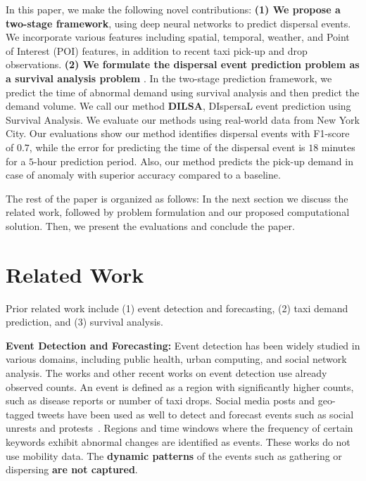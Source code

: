 \documentclass[letterpaper]{article} %
\begin{document}
In this paper, we make the following novel contributions: \textbf{(1) We propose a two-stage framework}, using deep neural networks to predict dispersal events. We incorporate various features including spatial, temporal, weather, and Point of Interest (POI) features, in addition to recent taxi pick-up and drop observations. %
\textbf{(2) We formulate the dispersal event prediction problem as a survival analysis problem} \cite{miller2011survival}.%
In the two-stage prediction framework, we predict the time of abnormal demand using survival analysis and then predict the demand volume. We call our method \textbf{DILSA}, DIspersaL event prediction using Survival Analysis. We evaluate our methods using real-world data from New York City. Our evaluations show our method identifies dispersal events with F1-score of $0.7$, while the error for predicting the time of the dispersal event is $18$ minutes for a $5$-hour prediction period. Also, our method predicts the pick-up demand in case of anomaly with superior accuracy compared to a baseline.

The rest of the paper is organized as follows: In the next section we discuss the related work, followed by problem formulation and our proposed computational solution. Then, we present the evaluations and conclude the paper.



\section{Related Work}
\label{related_work}
Prior related work include (1) event detection and forecasting, (2) taxi demand prediction, and (3) survival analysis.

\textbf{Event Detection and Forecasting:} Event detection has been widely studied in various domains, including public health, urban computing, and social network analysis. The works \cite{kulldorff1997spatial,kulldorff2005space,neill2009expectation} and other recent works on event detection \cite{li2012mining,hong2015detecting} use already observed counts. An event is defined as a region with significantly higher counts, such as disease reports or number of taxi drops. Social media posts and geo-tagged tweets have been used as well to detect and forecast events such as social unrests and protests~\cite{zhou2014event,chen2014non,liu2016graph,zhang2017triovecevent}. Regions and time windows where the frequency of certain keywords exhibit abnormal changes are identified as events. These works do not use mobility data. The \textbf{dynamic patterns} of the events such as gathering or dispersing \textbf{are not captured}.
\end{document}
